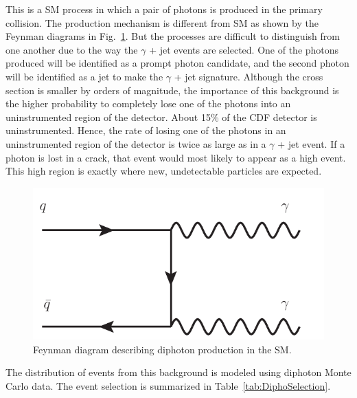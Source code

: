 This is a SM process in which a pair of photons is produced in the primary collision. The production mechanism is different from SM \phojets as shown by the Feynman diagrams in Fig.~\ref{fig:Feyn_dipho_annihilation}. But the processes are difficult to distinguish from one another due to the way the $\gamma$ + jet events are selected. One of the photons produced will be identified as a prompt photon candidate, and the second photon will be identified as a jet to make the $\gamma$ + jet signature. Although the cross section is smaller by orders of magnitude, the importance of this background is the higher probability to completely lose one of the photons into an uninstrumented region of the detector. About 15\% of the CDF detector is uninstrumented. Hence, the rate of losing one of the photons in an uninstrumented region of the detector is twice as large as in a $\gamma$ + jet event. If a photon is lost in a crack, that event would most likely to appear as a high \met event. This high \met region is exactly where new, undetectable particles are expected.
\begin{figure}[hbtm]
 \centering
 \includegraphics[scale=0.7,keepaspectratio=true]{./Feyn_dipho_annihilation.pdf}
 \caption{Feynman diagram describing diphoton production in the SM.}
\label{fig:Feyn_dipho_annihilation}
\end{figure}
\vspace{-0.01\textheight}


The distribution of events from this background is modeled using diphoton Monte Carlo data. The event selection is summarized in Table~\ref{tab:DiphoSelection}.

